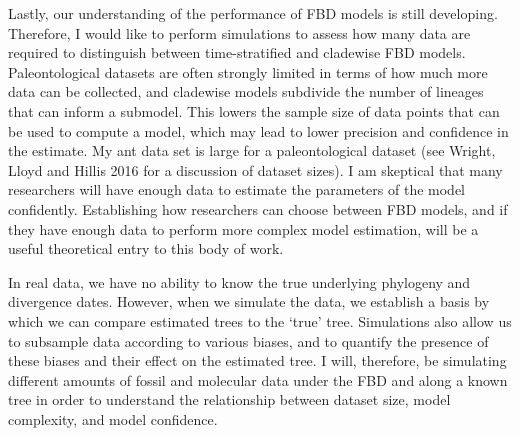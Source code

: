 \documentclass[12pt]{article}
\begin{document}
Lastly, our understanding of the performance of FBD models is still developing. 
Therefore, I would like to perform simulations to assess how many data are required to distinguish between time-stratified and cladewise FBD models.
Paleontological datasets are often strongly limited in terms of how much more data can be collected, and cladewise models subdivide the number of lineages that can inform a submodel.
This lowers the sample size of data points that can be used to compute a model, which may lead to lower precision and confidence in the estimate.
My ant data set is large for a paleontological dataset (see Wright, Lloyd and Hillis 2016 for a discussion of dataset sizes). 
I am skeptical that many researchers will have enough data to estimate the parameters of the model confidently.
Establishing how researchers can choose between FBD models, and if they have enough data to perform more complex model estimation, will be a useful theoretical entry to this body of work. \par
In real data, we have no ability to know the true underlying phylogeny and divergence dates.
However, when we simulate the data, we establish a basis by which we can compare estimated trees to the `true' tree.
Simulations also allow us to subsample data according to various biases, and to quantify the presence of these biases and their effect on the estimated tree.
I will, therefore, be simulating different amounts of fossil and molecular data under the FBD and along a known tree in order to understand the relationship between dataset size, model complexity, and model confidence. \par 
\end{document}
